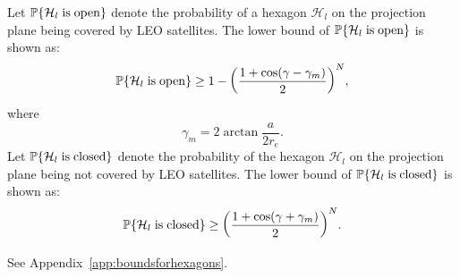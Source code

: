 \documentclass[final]{IEEEtran}
\begin{document}
\begin{lemma}\label{lem:boundsforhexagons}
Let $\P\{\mathcal{H}_{l} {\rm \; is\;open}\}$ denote the probability of a hexagon $\mathcal{H}_{l}$ on the projection plane being covered by LEO satellites. 
The lower bound of $\P\{\mathcal{H}_{l} {\rm \; is\;open}\}$ is shown as:
\begin{equation}
\begin{array}{c}
    \P\{\mathcal{H}_{l} {\rm \; is\;open}\}\geq\displaystyle 1-\bigg(\frac{1+\cos(\gamma-\gamma_m)}{2}\bigg)^{N}, 
\end{array}
\label{mincoverageprob}
\end{equation}
where
\begin{equation}
    \gamma_m=2\arctan \frac{a}{2 r_e}.
\end{equation}
Let $\P\{\mathcal{H}_{l} {\rm \; is\;closed}\}$ denote the probability of the hexagon $\mathcal{H}_{l}$ on the projection plane being not covered by LEO satellites. The lower bound of $\P\{\mathcal{H}_{l} {\rm \; is\;closed}\}$ is shown as:
\begin{equation}
\begin{array}{c}
    \P\{\mathcal{H}_{l} {\rm \; is\;closed}\}\geq\displaystyle\bigg(\frac{1+\cos(\gamma+\gamma_m)}{2}\bigg)^{N}.
\end{array}
\label{minnotcoverageprob}
\end{equation}
\label{lem:minprobs}
\end{lemma}
\begin{IEEEproof}
    See Appendix~\ref{app:boundsforhexagons}.
\end{IEEEproof}
\end{document}

